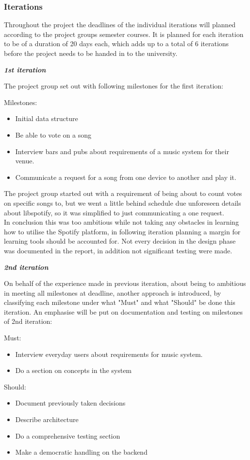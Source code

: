 \subsubsection{Iterations}

Throughout the project the deadlines of the individual iterations will planned according to the project groups semester courses. It is planned for each iteration to be of a duration of 20 days each, which adds up to a total of 6 iterations before the project needs to be handed in to the university.

\textit{\textbf{1st iteration}}

	The project group set out with following milestones for the first iteration:

	Milestones:
	\begin{itemize}
		\item Initial data structure
		\item Be able to vote on a song
		\item Interview bars and pubs about requirements of a music system for their venue.
		\item Communicate a request for a song from one device to another and play it.
	\end{itemize}

	The project group started out with a requirement of being about to count votes on specific songs to, but we went a little behind schedule due unforeseen details about libspotify, so it was simplified to just communicating a one request.\\
	In conclusion this was too ambitious while not taking any obstacles in learning how to utilise the Spotify platform, in following iteration planning a margin for learning tools should be accounted for. Not every decision in the design phase was documented in the report, in addition not significant testing were made.

\noindent\textit{\textbf{2nd iteration}}

	On behalf of the experience made in previous iteration, about being to ambitious in meeting all milestones at deadline, another approach is introduced, by classifying each milestone under what "Must" and what "Should" be done this iteration. An emphasise will be put on documentation and testing on milestones of 2nd iteration:

	Must:
	\begin{itemize}
		\item Interview everyday users about requirements for music system.
		\item Do a section on concepts in the system
	\end{itemize}

	Should:
	\begin{itemize}
		\item Document previously taken decisions
		\item Describe architecture
		\item Do a comprehensive testing section
		\item Make a democratic handling on the backend
	\end{itemize}